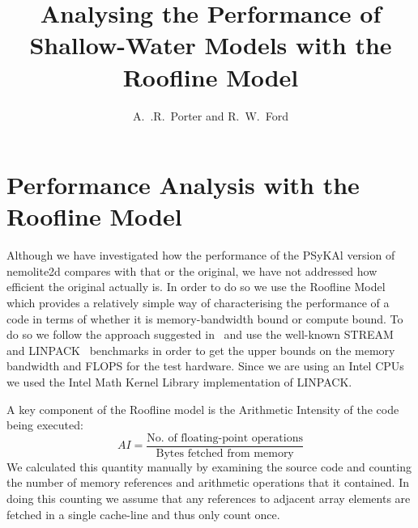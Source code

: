 \documentclass[12pt]{article}
\newcommand{\psykal}{{PS}y{KA}l}
\begin{document}
\title{Analysing the Performance of Shallow-Water Models with the
 Roofline Model}

\author{A.~.R.~Porter and R.~W.~Ford}

\maketitle

\section{Performance Analysis with the Roofline Model}

Although we have investigated how the performance of the \psykal
version of nemolite2d compares with that or the original, we have not
addressed how efficient the original actually is. In order to do so we
use the Roofline Model~\cite{roofline} which provides a relatively
simple way of characterising the performance of a code in terms of
whether it is memory-bandwidth bound or compute bound. To do so we
follow the approach suggested in~\cite{para_pearls} and use the
well-known STREAM~\cite{stream} and LINPACK~\cite{linpack} benchmarks
in order to get the upper bounds on the memory bandwidth and FLOPS for
the test hardware. Since we are using an Intel CPUs we used
the Intel Math Kernel Library implementation of LINPACK.

A key component of the Roofline model is the Arithmetic Intensity of
the code being executed:
\begin{equation}
AI = \frac{\textrm{No. of floating-point operations}}{\textrm{Bytes fetched from memory}}
\end{equation}
We calculated this quantity manually by examining the
source code and counting the number of memory references and
arithmetic operations that it contained. In doing this counting we
assume that any references to adjacent array elements are fetched in a
single cache-line and thus only count once.
\end{document}
